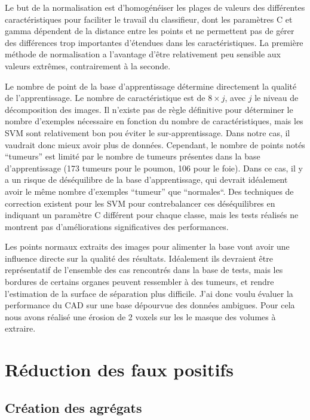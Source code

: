 Le but de la normalisation est d'homogénéiser les plages de valeurs des différentes caractéristiques pour faciliter le travail du classifieur, dont les paramètres C et gamma dépendent de la distance entre les points et ne permettent pas de gérer des différences trop importantes d'étendues dans les caractéristiques. La première méthode de normalisation a l'avantage d'être relativement peu sensible aux valeurs extrêmes, contrairement à la seconde.

Le nombre de point de la base d'apprentissage détermine directement la qualité de l'apprentissage. Le nombre de caractéristique est de $8 \times j$, avec $j$ le niveau de décomposition des images. Il n'existe pas de règle définitive pour déterminer le nombre d'exemples nécessaire en fonction du nombre de caractéristiques, mais les SVM sont relativement bon pou éviter le sur-apprentissage. Dans notre cas, il vaudrait donc mieux avoir plus de données. Cependant, le nombre de points notés ``tumeurs'' est limité par le nombre de tumeurs présentes dans la base d'apprentissage (173 tumeurs pour le poumon, 106 pour le foie). Dans ce cas, il y a un risque de déséquilibre de la base d'apprentissage, qui devrait idéalement avoir le même nombre d'exemples ``tumeur'' que ``normales``. Des techniques de correction existent pour les SVM pour contrebalancer ces déséquilibres en indiquant un paramètre C différent pour chaque classe, mais les tests réalisés ne montrent pas d'améliorations significatives des performances.

Les points normaux extraits des images pour alimenter la base vont avoir une influence directe sur la qualité des résultats. Idéalement ils devraient être représentatif de l'ensemble des cas rencontrés dans la base de tests, mais les bordures de certains organes peuvent ressembler à des tumeurs, et rendre l'estimation de la surface de séparation plus difficile. J'ai donc voulu évaluer la performance du CAD sur une base dépourvue des données ambigues. Pour cela nous avons réalisé une érosion de 2 voxels sur les le masque des volumes à extraire.

\section{Réduction des faux positifs}

\subsection{Création des agrégats}

